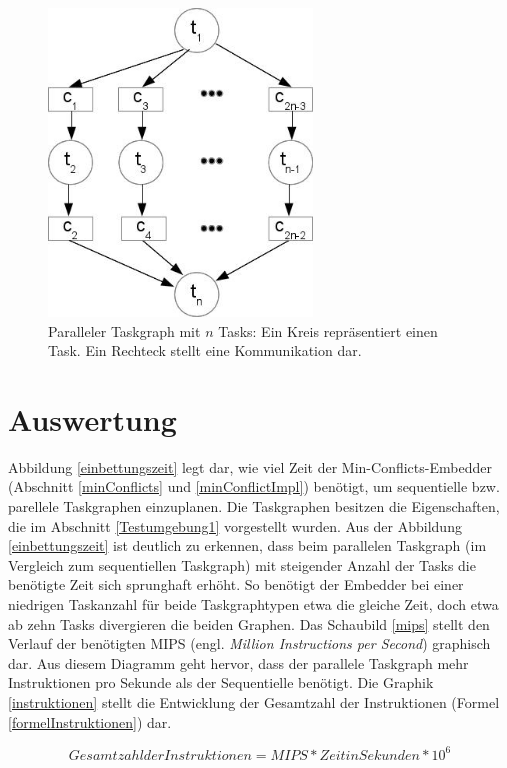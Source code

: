 \begin{figure}[H]\centering
  \includegraphics[width = 70mm]{bilder/parallel.jpg}
  \caption{Paralleler Taskgraph mit $n$ Tasks: Ein Kreis repräsentiert einen Task. Ein Rechteck stellt eine Kommunikation dar.}\label{fig:par}
\end{figure}

\section{Auswertung} \label{Auswertung} 

Abbildung \ref{einbettungszeit} legt dar,  wie viel Zeit der Min-Conflicts-Embedder (Abschnitt \ref{minConflicts} und \ref{minConflictImpl}) benötigt, um sequentielle bzw. parellele Taskgraphen einzuplanen. Die Taskgraphen besitzen die Eigenschaften, die im Abschnitt \ref{Testumgebung1} vorgestellt wurden. Aus der Abbildung \ref{einbettungszeit} ist deutlich zu erkennen, dass beim parallelen Taskgraph  (im Vergleich zum sequentiellen Taskgraph) mit steigender Anzahl der Tasks die benötigte Zeit sich sprunghaft erhöht. So benötigt der Embedder bei einer niedrigen Taskanzahl  für beide Taskgraphtypen etwa die gleiche Zeit, doch etwa ab zehn Tasks divergieren die beiden Graphen. Das Schaubild \ref{mips} stellt den Verlauf der benötigten MIPS (engl. \textit{Million Instructions per Second}) graphisch dar. Aus diesem Diagramm geht hervor, dass der parallele Taskgraph mehr Instruktionen pro Sekunde als der Sequentielle benötigt. Die Graphik \ref{instruktionen} stellt die Entwicklung der Gesamtzahl der Instruktionen (Formel \ref{formelInstruktionen}) dar.

\begin{equation}
Gesamtzahl der Instruktionen = MIPS * Zeit in Sekunden * 10^6
\label{formelInstruktionen}
\end{equation}

